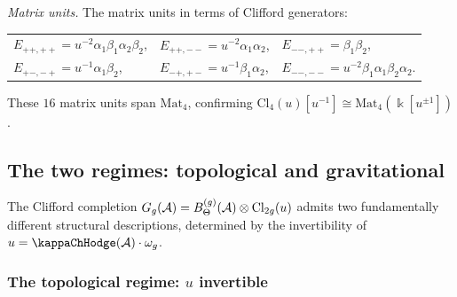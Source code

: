\emph{Matrix units.}\;
The matrix units in terms of Clifford generators:
\begin{center}
\renewcommand{\arraystretch}{1.2}
\begin{tabular}{lll}
$E_{++,++} = u^{-2}\alpha_1\beta_1\alpha_2\beta_2$, &
$E_{++,--} = u^{-2}\alpha_1\alpha_2$, &
$E_{--,++} = \beta_1\beta_2$, \\
$E_{+-,-+} = u^{-1}\alpha_1\beta_2$, &
$E_{-+,+-} = u^{-1}\beta_1\alpha_2$, &
$E_{--,--} = u^{-2}\beta_1\alpha_1\beta_2\alpha_2$.
\end{tabular}
\end{center}
These $16$ matrix units span $\mathrm{Mat}_4$, confirming
$\mathrm{Cl}_4(u)[u^{-1}] \cong \mathrm{Mat}_4(\Bbbk[u^{\pm 1}])$.

%
%

\subsection{The two regimes: topological and gravitational}

The Clifford completion $G_g(\mathcal{A}) = B_\Theta^{(g)}(\mathcal{A}) \otimes
\mathrm{Cl}_{2g}(u)$ admits two fundamentally different structural
descriptions, determined by the invertibility of
$u = \kappaChHodge(\cA) \cdot \omega_g$.

\subsubsection{The topological regime: $u$ invertible}

